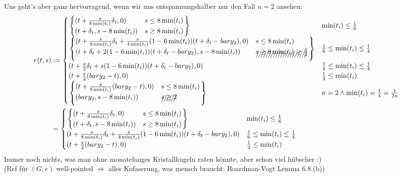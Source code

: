 \documentclass[11pt,twoside,a4paper]{scrbook} %
\begin{document}
\newpage
\begin{landscape}
Uns geht's aber ganz hervorragend, wenn wir uns entspannungshalber nur den Fall $n=2$ ansehen:
$$\begin{aligned}r(t,s)&
:={\begin{cases}
                       \left.\begin{cases}(t+\frac{s}{8\min(t_i)}\delta_t,0)&s\leq8\min(t_i)\\
                                          (t+\delta_t,s-8\min(t_i))         &s\geq8\min(t_i)\end{cases}\right\}
                           &\min(t_i)\leq\frac16\\
		       \left.\begin{cases}(t+\frac{s}{8\min(t_i)}\delta_t+\frac{s}{4\min(t_i)}(1-6\min(t_i))(t+\delta_t-bary_2),0)&s\leq8\min(t_i)\\
                                          (t+\delta_t+2(1-6\min(t_i))(t+\delta_t-bary_2),s-8\min(t_i))                            &\xout{s\geq8\min(t_i)\geq\frac43}\end{cases}\right\}
                           &\frac16 \leq\min(t_i)\leq\frac14\\
                             (t+\frac{s}2\delta_t+s(1-6\min(t_i))(t+\delta_t-bary_2),0)
                           &\frac14\leq \min(t_i)\leq\frac14\\
			     (t+\frac{s}2(bary_2-t),0)
                           &\frac14\leq\min(t_i)\\
		       \left.\begin{cases}(t+\frac{s}{8\min(t_i)}(bary_2-t),0)&s\leq8\min(t_i)\\
                                          (bary_2,s-8\min(t_i))               &\xout{s\geq2}\end{cases}\right\}
			   &n=2\wedge \min(t_i)=\frac14=\frac1{2n}\\
           \end{cases}}\\
&={\begin{cases}
                       \left.\begin{cases}(t+\frac{s}{8\min(t_i)}\delta_t,0) &s\leq8\min(t_i)\\
                                          (t+\delta_t,s-8\min(t_i))          &s\geq8\min(t_i)\\\end{cases}\right\}
                           &\min(t_i)\leq\frac16\\
                      (t+\frac{s}{8\min(t_i)}\delta_t+\frac{s}{4\min(t_i)}(1-6\min(t_i))(t+\delta_t-bary_2),0)
                           &\frac16 \leq\min(t_i)\leq\frac14\\
			     (t+\frac{s}2(bary_2-t),0)
                           &\frac14\leq\min(t_i)\\
           \end{cases}}
\end{aligned}$$
Immer noch nichts, was man ohne monatelanges Kristallkugeln raten k\"onnte, aber schon viel h\"ubscher :)\\
(Ref f\"ur $(G,e)$ well-pointed $\Rightarrow$ alles Kofaserung, was mensch braucht: Boardman-Vogt Lemma 6.8.(b))
\end{landscape}
\end{document}
